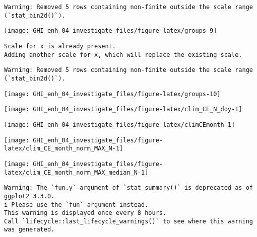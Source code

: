 \documentclass[
  10pt,
  a4paper,oneside]{article}
\begin{document}
\begin{verbatim}
Warning: Removed 5 rows containing non-finite outside the scale range
(`stat_bin2d()`).
\end{verbatim}

\begin{center}\texttt{[image: GHI\_enh\_04\_investigate\_files/figure-latex/groups-9]} \end{center}

\begin{verbatim}
Scale for x is already present.
Adding another scale for x, which will replace the existing scale.
\end{verbatim}

\begin{verbatim}
Warning: Removed 5 rows containing non-finite outside the scale range
(`stat_bin2d()`).
\end{verbatim}

\begin{center}\texttt{[image: GHI\_enh\_04\_investigate\_files/figure-latex/groups-10]} \end{center}

\begin{center}\texttt{[image: GHI\_enh\_04\_investigate\_files/figure-latex/clim\_CE\_N\_doy-1]} \end{center}

\begin{center}\texttt{[image: GHI\_enh\_04\_investigate\_files/figure-latex/climCEmonth-1]} \end{center}

\begin{center}\texttt{[image: GHI\_enh\_04\_investigate\_files/figure-latex/clim\_CE\_month\_norm\_MAX\_N-1]} \end{center}

\begin{center}\texttt{[image: GHI\_enh\_04\_investigate\_files/figure-latex/clim\_CE\_month\_norm\_MAX\_median\_N-1]} \end{center}

\begin{verbatim}
Warning: The `fun.y` argument of `stat_summary()` is deprecated as of ggplot2 3.3.0.
i Please use the `fun` argument instead.
This warning is displayed once every 8 hours.
Call `lifecycle::last_lifecycle_warnings()` to see where this warning was generated.
\end{verbatim}
\end{document}
